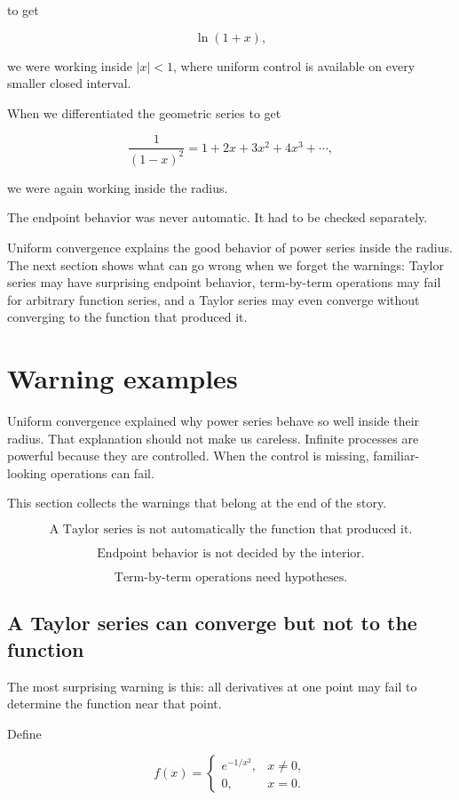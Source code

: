 to get

\[
\ln(1+x),
\]

we were working inside \(|x|<1\), where uniform control is available on every smaller
closed interval.

When we differentiated the geometric series to get

\[
\frac1{(1-x)^2}=1+2x+3x^2+4x^3+\cdots,
\]

we were again working inside the radius.

The endpoint behavior was never automatic.  It had to be checked separately.

Uniform convergence explains the good behavior of power series inside the radius.  The
next section shows what can go wrong when we forget the warnings: Taylor series may
have surprising endpoint behavior, term-by-term operations may fail for arbitrary
function series, and a Taylor series may even converge without converging to the function
that produced it.

\section{Warning examples}
\label{sec:warning-examples-taylor-series}

Uniform convergence explained why power series behave so well inside their radius.
That explanation should not make us careless.  Infinite processes are powerful because
they are controlled.  When the control is missing, familiar-looking operations can fail.

This section collects the warnings that belong at the end of the story.

\[
\boxed{
\text{A Taylor series is not automatically the function that produced it.}
}
\]

\[
\boxed{
\text{Endpoint behavior is not decided by the interior.}
}
\]

\[
\boxed{
\text{Term-by-term operations need hypotheses.}
}
\]

\subsection{A Taylor series can converge but not to the function}
\label{subsec:taylor-series-not-function}

The most surprising warning is this: all derivatives at one point may fail to determine
the function near that point.

Define

\[
f(x)=
\begin{cases}
e^{-1/x^2}, & x\neq0,\\
0, & x=0.
\end{cases}
\]

